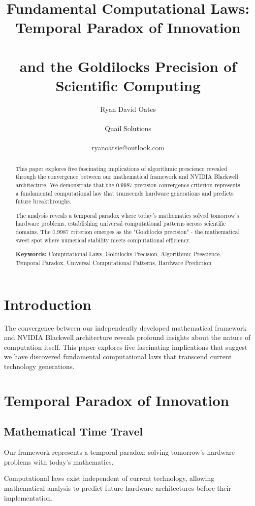 \documentclass[11pt,a4paper]{article}
\title{\textbf{Fundamental Computational Laws: Temporal Paradox of Innovation \\\\ and the Goldilocks Precision of Scientific Computing}}
\author{Ryan David Oates \\\\\nJumping Quail Solutions \\\\\n\href{mailto:ryanoatsie@outlook.com}{ryanoatsie@outlook.com}}
\begin{document}
\maketitle

\begin{abstract}
This paper explores five fascinating implications of algorithmic prescience revealed through the convergence between our mathematical framework and NVIDIA Blackwell architecture. We demonstrate that the 0.9987 precision convergence criterion represents a fundamental computational law that transcends hardware generations and predicts future breakthroughs.

The analysis reveals a temporal paradox where today's mathematics solved tomorrow's hardware problems, establishing universal computational patterns across scientific domains. The 0.9987 criterion emerges as the "Goldilocks precision" - the mathematical sweet spot where numerical stability meets computational efficiency.

\textbf{Keywords:} Computational Laws, Goldilocks Precision, Algorithmic Prescience, Temporal Paradox, Universal Computational Patterns, Hardware Prediction
\end{abstract}

\section{Introduction}

The convergence between our independently developed mathematical framework and NVIDIA Blackwell architecture reveals profound insights about the nature of computation itself. This paper explores five fascinating implications that suggest we have discovered fundamental computational laws that transcend current technology generations.

\section{Temporal Paradox of Innovation}

\subsection{Mathematical Time Travel}
Our framework represents a temporal paradox: solving tomorrow's hardware problems with today's mathematics.

\begin{theorem}
Computational laws exist independent of current technology, allowing mathematical analysis to predict future hardware architectures before their implementation.
\end{theorem}
\end{document}
